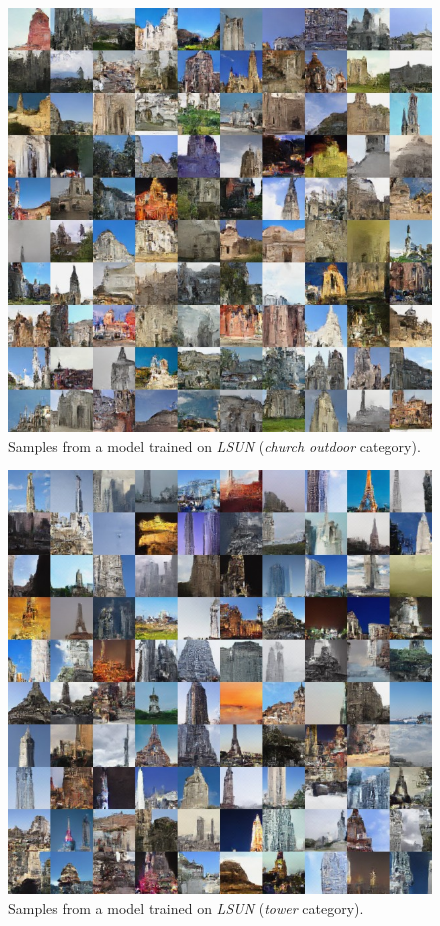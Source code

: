 \documentclass{article}
\begin{document}
\begin{figure}[H]
\vspace{80pt}
    \centering \includegraphics[width=1.\textwidth]{church_samples.jpg}
    \caption{Samples from a model trained on \emph{LSUN} (\emph{church outdoor} category).}
\end{figure}

\begin{figure}[H]
\vspace{80pt}
    \centering \includegraphics[width=1.\textwidth]{tower_samples.jpg}
    \caption{Samples from a model trained on \emph{LSUN} (\emph{tower} category).}
\end{figure}
\end{document}
